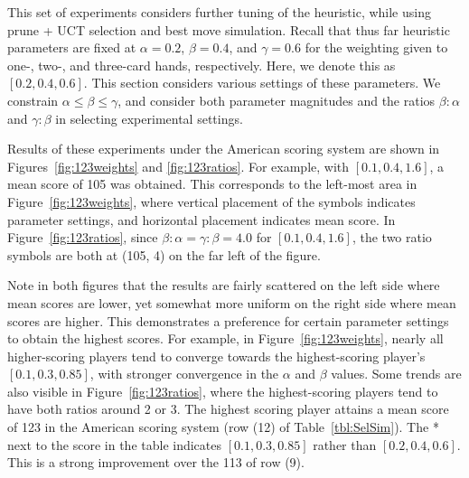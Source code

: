 \documentclass[letterpaper]{article}
\begin{document}
This set of experiments considers further tuning of the heuristic, while using prune + UCT selection and best move simulation. Recall that thus far heuristic parameters are fixed at $\alpha = 0.2$, $\beta = 0.4$, and $\gamma = 0.6$ for the weighting given to one-, two-, and three-card hands, respectively. Here, we denote this as $[0.2, 0.4, 0.6]$. This section considers various settings of these parameters. We constrain $\alpha \leq \beta \leq \gamma$, and consider both parameter magnitudes and the ratios $\beta : \alpha$ and $\gamma : \beta$ in selecting experimental settings.


Results of these experiments under the American scoring system are shown in Figures~\ref{fig:123weights} and \ref{fig:123ratios}. For example, with $[0.1, 0.4, 1.6]$, a mean score of 105 was obtained. This corresponds to the left-most area in Figure~\ref{fig:123weights}, where vertical placement of the symbols indicates parameter settings, and horizontal placement indicates mean score. In Figure~\ref{fig:123ratios}, since $\beta:\alpha = \gamma:\beta = 4.0$ for $[0.1, 0.4, 1.6]$, the two ratio symbols are both at (105, 4) on the far left of the figure.

Note in both figures that the results are fairly scattered on the left side where mean scores are lower, yet somewhat more uniform on the right side where mean scores are higher. This demonstrates a preference for certain parameter settings to obtain the highest scores. For example, in Figure~\ref{fig:123weights}, nearly all higher-scoring players tend to converge towards the highest-scoring player's $[0.1, 0.3, 0.85]$, with stronger convergence in the $\alpha$ and $\beta$ values. Some trends are also visible in Figure~\ref{fig:123ratios}, where the highest-scoring players tend to have both ratios around 2 or 3. The highest scoring player attains a mean score of 123 in the American scoring system (row (12) of Table~\ref{tbl:SelSim}). The \mbox{*} next to the score in the table indicates $[0.1, 0.3, 0.85]$ rather than $[0.2, 0.4, 0.6]$. This is a strong improvement over the 113 of row (9).
\end{document}
